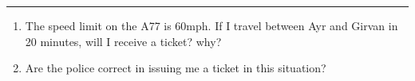 \documentclass[11pt]{article}
\begin{document}
%
%
%
%
%
%
%
%
%
%
%

\vspace{.15in}

\hrule

\begin{enumerate}
\item The speed limit on the A77 is 60mph. If I travel between Ayr and
  Girvan in 20 minutes, will I receive a ticket? why?
  \vfill
\item Are the police correct in issuing me a ticket in this situation?
  \vfill
\end{enumerate}



\nocite{*}

\end{document}
